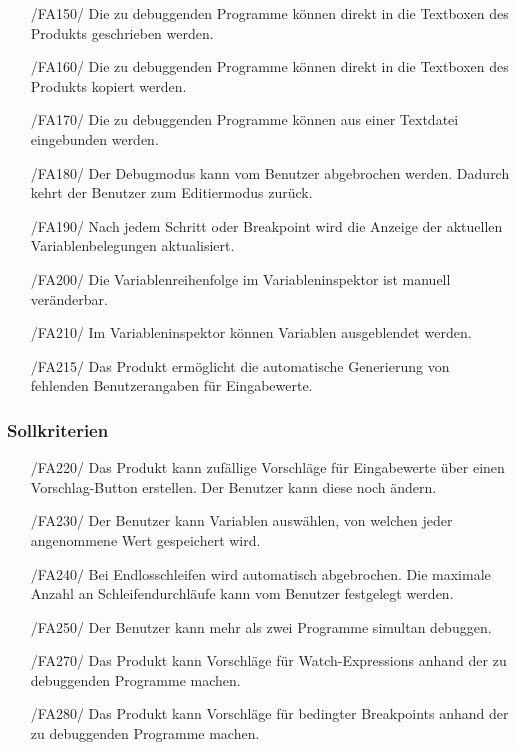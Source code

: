 \documentclass[parskip=full]{scrartcl}
\begin{document}
\begin{itemize}
		\item[/FA150/] Die zu debuggenden Programme können direkt in die Textboxen des Produkts  geschrieben werden.
		\item[/FA160/] Die zu debuggenden Programme können direkt in die Textboxen des Produkts kopiert werden.
		\item[/FA170/] Die zu debuggenden Programme können aus einer Textdatei eingebunden werden.
		\item[/FA180/] Der Debugmodus kann vom Benutzer abgebrochen werden. Dadurch kehrt der Benutzer zum \gls{Editiermodus} zurück.
		\item[/FA190/] Nach jedem \gls{Schritt} oder Breakpoint wird die Anzeige der aktuellen Variablenbelegungen aktualisiert.
                \item[/FA200/] Die Variablenreihenfolge im \gls{Variableninspektor} ist manuell veränderbar.
		\item[/FA210/] Im Variableninspektor können Variablen ausgeblendet werden.
		\item[/FA215/] Das Produkt ermöglicht die automatische Generierung von fehlenden Benutzerangaben für Eingabewerte.
		\end{itemize}

 		\subsubsection{Sollkriterien}
		\begin{itemize}
		\item[/FA220/] Das Produkt kann zufällige Vorschläge für Eingabewerte über einen Vorschlag-Button erstellen. Der Benutzer kann diese noch ändern.
		\item[/FA230/] Der Benutzer kann Variablen auswählen, von welchen jeder angenommene Wert gespeichert wird.
		\item[/FA240/] Bei Endlosschleifen wird automatisch abgebrochen. Die maximale Anzahl an Schleifendurchläufe kann vom Benutzer festgelegt werden.
		\item[/FA250/] Der Benutzer kann mehr als zwei Programme simultan debuggen.
		\item[/FA270/] Das Produkt kann Vorschläge für \glspl{Watch-Expression} anhand der zu debuggenden Programme machen.
		\item[/FA280/] Das Produkt kann Vorschläge für \glspl{bedingter Breakpoint} anhand der zu debuggenden Programme machen.
		\end{itemize}
\end{document}
